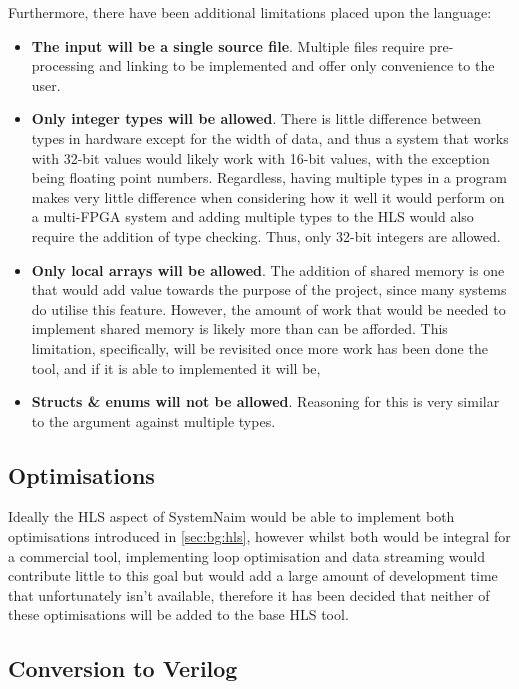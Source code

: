 Furthermore, there have been additional limitations placed upon the language:

\begin{itemize}
    \item \textbf{The input will be a single source file}. Multiple files require pre-processing and linking to be implemented and offer only convenience to the user.
    \item \textbf{Only integer types will be allowed}. There is little difference between types in hardware except for the width of data, and thus a system that works with 32-bit values would likely work with 16-bit values, with the exception being floating point numbers. Regardless, having multiple types in a program makes very little difference when considering how it well it would perform on a multi-FPGA system and adding multiple types to the HLS would also require the addition of type checking. Thus, only 32-bit integers are allowed.
    \item \textbf{Only local arrays will be allowed}. The addition of shared memory is one that would add value towards the purpose of the project, since many systems do utilise this feature. However, the amount of work that would be needed to implement shared memory is likely more than can be afforded. This limitation, specifically, will be revisited once more work has been done the tool, and if it is able to implemented it will be,
    \item \textbf{Structs \& enums will not be allowed}. Reasoning for this is very similar to the argument against multiple types.
\end{itemize}


\subsection{Optimisations}

Ideally the HLS aspect of SystemNaim would be able to implement both optimisations introduced in \autoref{sec:bg:hls}, however whilst both would be integral for a commercial tool, implementing loop optimisation and data streaming would contribute little to this goal but would add a large amount of development time that unfortunately isn't available, therefore it has been decided that neither of these optimisations will be added to the base HLS tool.

\subsection{Conversion to Verilog}

